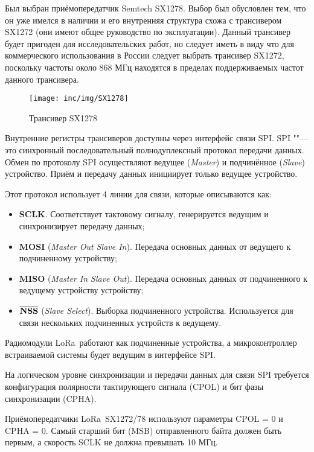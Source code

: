 Был выбран приёмопередатчик Semtech SX1278. Выбор был обусловлен тем, что он 
уже имелся в наличии и его внутренняя структура схожа с трансивером SX1272 (они 
имеют общее руководство по эксплуатации).
Данный трансивер будет пригоден для исследовательских работ, но следует иметь в 
виду что для коммерческого использования в России следует выбрать трансивер 
SX1272, поскольку частоты около 868 МГц находятся в пределах поддерживаемых 
частот данного трансивера.

\begin{figure}[!h]
  \centering
  \texttt{[image: inc/img/SX1278]}
  \caption{Трансивер SX1278}
  \label{fig:sx1278}
\end{figure}

Внутренние регистры трансиверов доступны через интерфейс связи SPI.
SPI ""--- это синхронный последовательный полнодуплексный протокол передачи 
данных. 
Обмен по протоколу SPI осуществляют ведущее (\textit{Master}) и подчинённое 
(\textit{Slave}) устройство. Приём и передачу данных инициирует только ведущее 
устройство.

Этот протокол использует 4 линии для связи, которые описываются как:
\begin{itemize}
 \item \textbf{SCLK}. Соответствует тактовому сигналу, генерируется ведущим и 
синхронизирует передачу данных;
 \item \textbf{MOSI} (\textit{Master Out Slave In}). Передача основных данных 
от ведущего к подчиненному устройству;
 \item \textbf{MISO} (\textit{Master In Slave Out}). Передача основных данных 
от подчиненного к ведущему устройству устройству;
 \item $\overline{\text{\textbf{NSS}}}$ (\textit{Slave Select}). Выборка 
подчиненного устройства. Используется для связи нескольких подчиненных 
устройств к ведущему. 
\end{itemize}

Радиомодули LoRa\texttrademark~работают как подчиненные устройства, а 
микроконтроллер 
встраиваемой системы будет ведущим в интерфейсе SPI.

На логическом уровне синхронизации и передачи данных для связи SPI требуется 
конфигурация полярности тактирующего сигнала (CPOL) и бит фазы синхронизации 
(CPHA).

Приёмопередатчики LoRa\texttrademark~SX1272/78 используют параметры CPOL = 0 и 
CPHA = 0.
Самый старший бит (MSB) отправленного байта должен быть первым, а скорость SCLK 
не должна превышать 10 МГц.

